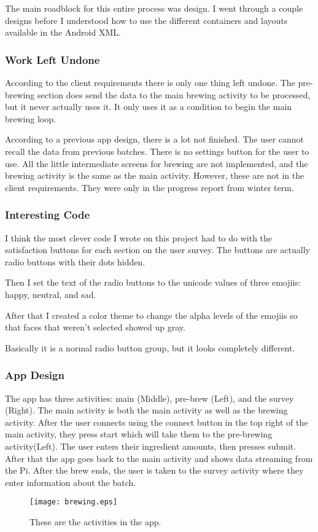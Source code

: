 \documentclass[draftclsnofoot,onecolumn,letterpaper,10pt]{IEEEtran}
\begin{document}
The main roadblock for this entire process was design.
I went through a couple designs before I understood how to use the different containers and layouts available in the Android XML.



\subsubsection{Work Left Undone}
According to the client requirements there is only one thing left undone.
The pre-brewing section does send the data to the main brewing activity to be processed, but it never actually uses it.
It only uses it as a condition to begin the main brewing loop.

According to a previous app design, there is a lot not finished.
The user cannot recall the data from previous batches. There is no settings button for the user to use.
All the little intermediate screens for brewing are not implemented, and the brewing activity is the same as the main activity.
However, these are not in the client requirements. They were only in the progress report from winter term.

\subsubsection{Interesting Code}
I think the most clever code I wrote on this project had to do with the satisfaction buttons for each section on the user survey.
The buttons are actually radio buttons with their dots hidden.

Then I set the text of the radio buttons to the unicode values of three emojiis: happy, neutral, and sad.

After that I created a color theme to change the alpha levels of the emojiis so that faces that weren't selected showed up gray.

Basically it is a normal radio button group, but it looks completely different.
\newpage
\vfill
\subsubsection{App Design}
The app has three activities: main (Middle), pre-brew (Left), and the survey (Right).
The main activity is both the main activity as well as the brewing activity.
After the user connects using the connect button in the top right of the main activity, they press start which will take them to the pre-brewing activity(Left).
The user enters their ingredient amounts, then presses submit. After that the app goes back to the main activity and shows data streaming from the Pi.
After the brew ends, the user is taken to the survey activity where they enter information about the batch.
\begin{figure}
\label{fig:code}
\caption{These are the activities in the app.}
\texttt{[image: brewing.eps]}
\end{figure}
\end{document}

